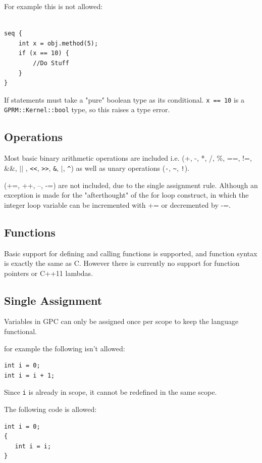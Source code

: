 For example this is not allowed:
\begin{lstlisting}[style=myGPC]

seq {
    int x = obj.method(5);
    if (x == 10) {
        //Do Stuff
    }    
}

\end{lstlisting}

If statements must take a "pure" boolean type as its conditional.
\texttt{x == 10} is a \texttt{GPRM::Kernel::bool} type, so this raises a type error.
  
\subsection{Operations}
        Most basic binary arithmetic operations are included i.e. 
        (+, -, *, /, \%, ==, !=, \&\&, $||$ , \lstinline|<<|, \lstinline|>>|, \lstinline|&|, $|$, 
        \lstinline|^|) as well as
        unary operations 
        (\lstinline|-|, \lstinline|~|, \lstinline|!|).

        (+=, ++, --, -=) are not included, due to the single assignment rule.
        Although an exception is made for the "afterthought" of the for loop construct, in which
        the integer loop variable can be incremented with += or decremented by -=.

\subsection{Functions}
 Basic support for defining and calling functions is supported, and function  
 syntax is exactly the same as C. However there is currently no
 support for function pointers or C++11 lambdas. 


\subsection{Single Assignment}
\label{sub:single}
Variables in GPC can only be assigned once per scope to keep
the language functional.

for example the following isn't allowed:

\begin{lstlisting}[style=myGPC]
int i = 0;
int i = i + 1;
\end{lstlisting}

Since \texttt{i} is already in scope, it cannot be redefined in the same scope.

The following code is allowed:

\begin{lstlisting}[style=myGPC]
int i = 0;
{
   int i = i;
}
\end{lstlisting}

